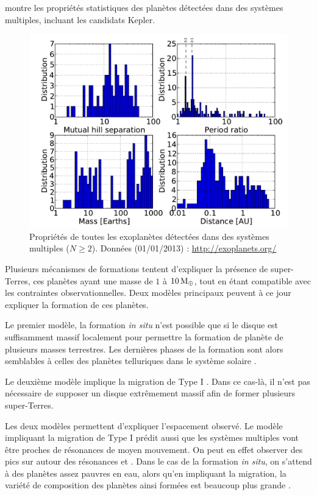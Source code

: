 montre les propriétés statistiques des planètes détectées dans des systèmes multiples, incluant les candidats Kepler.%

\begin{figure}[htbp]
\centering
\includegraphics[width=0.8\linewidth]{figure/multiplanet_systems_stats.pdf}
\caption{Propriétés de toutes les exoplanètes détectées dans des systèmes multiples ($N\geqslant 2$). Données (01/01/2013) : \url{http://exoplanets.org/}}\label{fig:multiplanet_stats}
\end{figure}

\bigskip

Plusieurs mécanismes de formations tentent d'expliquer la présence de super-Terres, ces planètes ayant une masse de $1$ à $10\mathrm{\thinspace M_\oplus}$, tout en étant compatible avec les contraintes observationnelles. Deux modèles principaux peuvent à ce jour expliquer la formation de ces planètes. 

Le premier modèle, la \og formation \textit{in situ}\fg \citep{chiang2013minimum} n'est possible que si le disque est
suffisamment massif localement pour permettre la formation de planète de plusieurs masses terrestres. Les dernières phases de la
formation sont alors semblables à celles des planètes telluriques dans le système solaire \citep{wetherill1990formation,
kenyon2006terrestrial, morbidelli2012building}.

Le deuxième modèle implique la migration de Type I \citep{terquem2007migration}. Dans ce cas-là, il n'est pas nécessaire de supposer un disque extrêmement massif afin de former plusieurs super-Terres. 

Les deux modèles permettent d'expliquer l'espacement observé. Le modèle impliquant la migration de Type I prédit aussi que les
systèmes multiples vont être proches de résonances de moyen mouvement. On peut en effet observer des pics sur
 autour des résonances  et  \citep{rein2012period}. Dans le cas de la
formation \textit{in situ}, on s'attend à des planètes assez pauvres en eau, alors qu'en impliquant la migration, la variété de
composition des planètes ainsi formées est beaucoup plus grande \citep{raymond2008observable}.

